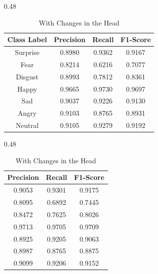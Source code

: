 \begin{table}[H]
\centering
\caption{Comparison of Base Model Classification Results}
\label{tab:class_base_model_comparison}

\begin{subtable}{0.48\textwidth}
\centering
\small %
\caption{Without Changes in the Head}
\begin{tabular}{cccc}
\hline
\textbf{Class Label} & \textbf{Precision} & \textbf{Recall} & \textbf{F1-Score} \\ \hline
Surprise  & 0.8980 & 0.9362 & 0.9167 \\
Fear      & 0.8214 & 0.6216 & 0.7077 \\
Disgust & 0.8993 & 0.7812 & 0.8361 \\
Happy     & 0.9665 & 0.9730 & 0.9697 \\
Sad       & 0.9037 & 0.9226 & 0.9130 \\
Angry     & 0.9103 & 0.8765 & 0.8931 \\
Neutral   & 0.9105 & 0.9279 & 0.9192 \\
\hline
\end{tabular}
\end{subtable}
\hfill
\begin{subtable}{0.48\textwidth}
\centering
\small
\caption{With Changes in the Head}
\begin{tabular}{ccc}
\hline
\textbf{Precision} & \textbf{Recall} & \textbf{F1-Score} \\ \hline
0.9053 & 0.9301 & 0.9175 \\
0.8095 & 0.6892 & 0.7445 \\
0.8472 & 0.7625 & 0.8026 \\
0.9713 & 0.9705 & 0.9709 \\
0.8925 & 0.9205 & 0.9063 \\
0.8987 & 0.8765 & 0.8875 \\
0.9099 & 0.9206 & 0.9152 \\
\hline
\end{tabular}
\end{subtable}

\end{table}

